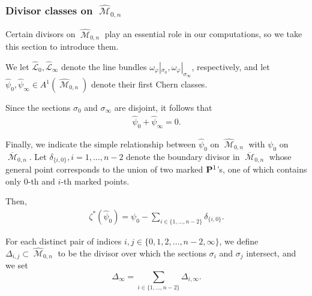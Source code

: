 \documentclass[12pt,reqno]{amsart}
\DeclareMathOperator{\M}{\mathcal{M}}
\numberwithin{equation}{section}
\newcommand{\hL}{\widehat{\mathcal{L}}}
\newcommand{\hpsi}{\widehat{\psi}}
\newcommand{\hM}{\widehat{\M}}
\renewcommand {\o}[1]{\overline{#1}}
\begin{document}
\subsubsection{Divisor classes on $\hM_{0,n}$}
\label{sec:divisor-classes-hm_0}

Certain divisors on $\hM_{0,n}$  play an essential role in our
computations, so we take this section to introduce them.

\begin{definition}
  \label{def:psihats} We let $\hL_{0}, \hL_{\infty}$ denote the line
  bundles
  $\omega_{\varphi}|_{\sigma_{0}},
  \omega_{\varphi}|_{\sigma_{\infty}}$, respectively, and let
  $\hpsi_{0}, \hpsi_{\infty} \in A^{1}(\hM_{0,n})$ denote their first
  Chern classes.
\end{definition}

Since the sections $\sigma_{0}$ and $\sigma_{\infty}$ are disjoint, it
follows that
\begin{align}
  \label{eq:opposites}
  \hpsi_{0} + \hpsi_{\infty} = 0.
\end{align}


Finally, we indicate the simple relationship between $\hpsi_{0}$ on
$\hM_{0,n}$ with $\psi_{0}$ on $\o{\M}_{0,n}$.  Let
$\delta_{\{i,0\}}, i=1, \dots, n-2$ denote the boundary divisor in
$\o{\M}_{0,n}$ whose general point corresponds to the union of two
marked $\P^{1}$'s, one of which contains only $0$-th and $i$-th marked
points.



Then,
\begin{align}
  \label{eq:relationpsis}
\zeta^{*}(\hpsi_{0}) = \psi_{0} - \sum_{i \in \{1, \dots, n-2\}} \delta_{\{i,0\}}.  
\end{align}













\begin{definition}
  \label{def:boundary}
  For each distinct pair of indices
  $i,j \in \{0, 1, 2, \dots, n-2, \infty \}$, we define
  $\Delta_{i,j} \subset \hM_{0,n}$ to be the divisor over which the
  sections $\sigma_{i}$ and $\sigma_{j}$ intersect, and we set
  $$\Delta_{\infty} = \sum_{i \in \{1, \dots, n-2 \}}
  \Delta_{i,\infty}.$$
\end{definition}
\end{document}
